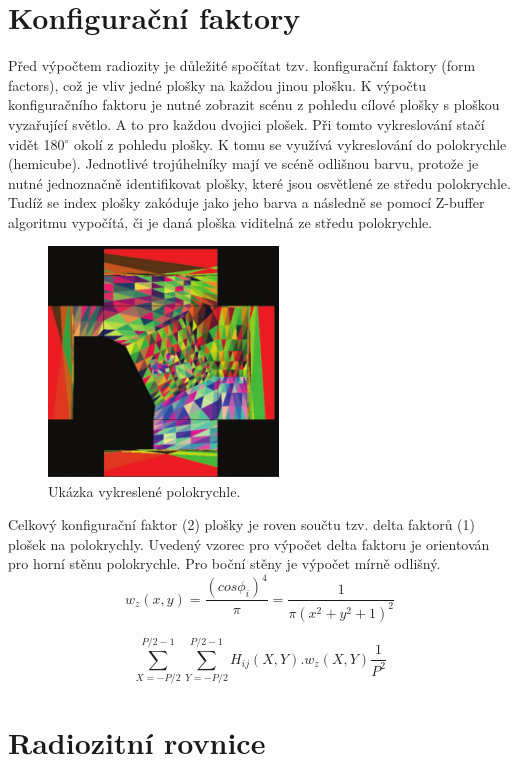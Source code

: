 \documentclass[12pt,a4paper,titlepage,final]{report}
\begin{document}
\section{Konfigurační faktory}
Před výpočtem radiozity je důležité spočítat tzv. konfigurační faktory \cite{cite1} (form factors), což je vliv jedné plošky na každou jinou plošku. K výpočtu konfiguračního faktoru je nutné zobrazit scénu z pohledu cílové plošky s ploškou vyzařující světlo. A to pro každou dvojici plošek. Při tomto vykreslování stačí vidět 180$^\circ$ okolí z pohledu plošky. K tomu se využívá vykreslování do polokrychle (hemicube). Jednotlivé trojúhelníky mají ve scéně odlišnou barvu, protože je nutné jednoznačně identifikovat plošky, které jsou osvětlené ze středu polokrychle. Tudíž se index plošky zakóduje jako jeho barva a následně se pomocí Z-buffer algoritmu vypočítá, či je daná ploška viditelná ze středu polokrychle.
\begin{figure}[!b]
\begin{center}
\includegraphics[height=6.1cm]{images/hemicube.pdf}
\caption{Ukázka vykreslené polokrychle.}
\end{center}
\end{figure}

Celkový konfigurační faktor (2) plošky je roven součtu tzv. delta faktorů (1) plošek na polokrychly. 
Uvedený vzorec pro výpočet delta faktoru je orientován pro horní stěnu polokrychle. Pro boční stěny je výpočet mírně odlišný. 
\begin{equation}
w_{z}(x,y) = \frac{(cos\phi_{i})^{4}}{\pi} = \frac{1}{\pi(x^{2}+y^{2}+1)^{2}}
\end{equation}

\begin{equation}
\sum_{X=-P/2}^{P/2-1}\sum_{Y=-P/2}^{P/2-1}H_{ij}(X,Y).w_{z}(X,Y)\frac{1}{P^{2}}
\end{equation}


\section{Radiozitní rovnice}
\end{document}

